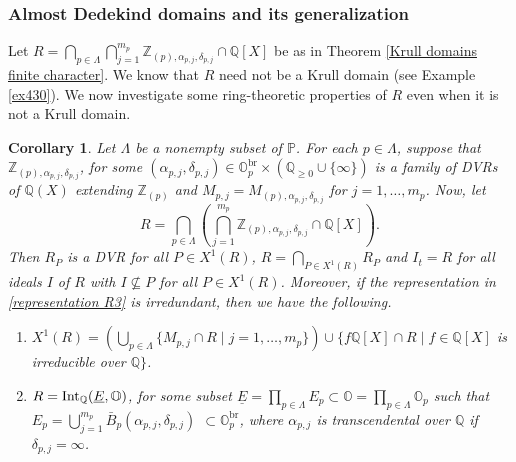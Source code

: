 \documentclass[10pt]{article}
\numberwithin{equation}{section}
\newtheorem{Cor}[equation]{Corollary}
\theoremstyle{definition}
\theoremstyle{definition}
\newcommand{\Q}{\mathbb{Q}}
\newcommand{\Z}{\mathbb{Z}}
\renewcommand{\O}{\mathbb{O}}
\newcommand{\PP}{\mathbb{P}}
\newcommand{\Int}{\textnormal{Int}}
\newcommand{\IntQ}{\Int_{\Q}}
\newcommand{\uE}{\underline{E}}
\newcommand{\br}{\text{br}}
\begin{document}
 \vskip1cm

\subsubsection{Almost Dedekind domains  and its generalization} 

Let $R=\bigcap\limits_{p\in\Lambda}\bigcap\limits_{j=1}^{m_p}\Z_{(p),\alpha_{p,j},\delta_{p,j}}\cap\Q[X]$ be as in Theorem \ref{Krull domains finite character}. We know that $R$ need not be a Krull domain (see Example \ref{ex430}). We now investigate some ring-theoretic properties of $R$ even when it is not a Krull domain.


\begin{Cor} \label{thm3}
Let $\Lambda$ be a nonempty subset of $\PP$.
For each $p \in \Lambda$, suppose that $\Z_{(p),\alpha_{p,j},\delta_{p,j}}$,
for some $(\alpha_{p,j},\delta_{p,j})\in\O_p^{\br}\times(\Q_{\geq0}\cup\{\infty\})$ is a family of DVRs of $\Q(X)$ extending $\Z_{(p)}$
and $M_{p,j} = M_{(p),\alpha_{p,j},\delta_{p,j}}$ for $j = 1, \dots , m_p$. Now, let
\begin{equation}\label{representation R3}
R = \bigcap_{p \in \Lambda} (\bigcap_{j=1}^{m_p}\Z_{(p),\alpha_{p,j},\delta_{p,j}} \cap\Q[X]).
\end{equation}
Then $R_P$ is a DVR for all $P \in X^1(R)$, $R = \bigcap\limits_{P \in X^1(R)}R_P$ and $I_t = R$ for all ideals $I$ of $R$ with $I \nsubseteq P$ for all $P \in X^1(R)$. 
Moreover, if the representation in \eqref{representation R3} is irredundant, then we have the following.
\begin{enumerate}
\item[{\em (1)}] $X^1(R) = (\bigcup\limits_{p \in \Lambda}\{M_{p,j} \cap R \mid j=1, \dots , m_p\}) \cup \{f\Q[X] \cap R \mid f \in \Q[X]$ is irreducible over $\Q\}$. 


\item[{\em (2)}] $R = \IntQ(\uE,\O)$, for some subset $\uE=\prod_{p\in\Lambda}E_p\subset\O=\prod\limits_{p\in\Lambda}\O_p$ 
such that $E_p = \bigcup\limits_{j=1}^{m_p} \bar B_p(\alpha_{p,j},\delta_{p,j})$ $\subset\O_p^{\br}$, where $\alpha_{p,j}$ is transcendental over $\Q$ if $\delta_{p,j}=\infty$.
\end{enumerate}
\end{Cor}
\end{document}
